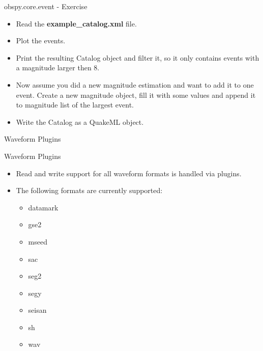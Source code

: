 \documentclass[handout]{beamer}
\begin{document}
\begin{frame}{obspy.core.event - Exercise}
    \begin{itemize}
        \item Read the \textbf{example\_catalog.xml} file.
        \item Plot the events.
        \item Print the resulting Catalog object and filter it, so it only contains events with a magnitude larger then 8.
        \item Now assume you did a new magnitude estimation and want to add it
            to one event. Create a new magnitude object, fill it with some
            values and append it to magnitude list of the largest event.
        \item Write the Catalog as a QuakeML object.
    \end{itemize}
\end{frame}

\begin{frame}{}
    \begin{center}
        \textcolor{lmu@darkgreen}{\LARGE{Waveform Plugins}}
    \end{center}
\end{frame}


\begin{frame}{Waveform Plugins}
    \begin{itemize}
        \item Read and write support for all waveform formats is handled via plugins.
        \item The following formats are currently supported:
            \begin{itemize}
                \item datamark
                \item gse2
                \item mseed
                \item sac
                \item seg2
                \item segy
                \item seisan
                \item sh
                \item wav
            \end{itemize}
    \end{itemize}
\end{frame}
\end{document}
